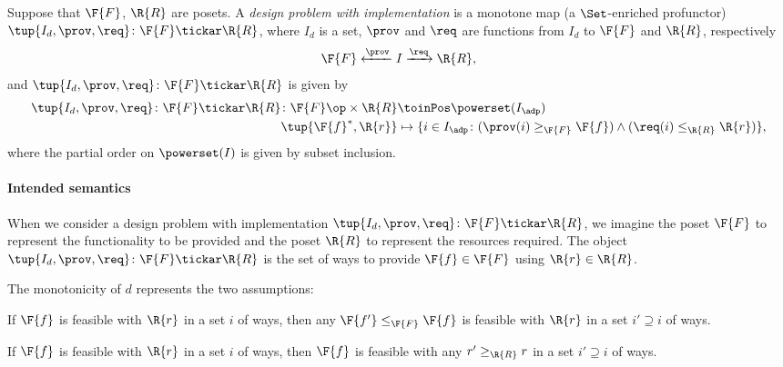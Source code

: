\begin{definition}
\label{def:dpwithimp}
Suppose that $\F{F}$, $\R{R}$ are posets. A \emph{design problem with implementation} is a monotone map (a $\Set$-enriched profunctor) $\tup{I_d,\prov,\req}\colon \F{F}\tickar \R{R}$, where $I_d$ is a set, $\prov$ and $\req$ are functions from $I_d$ to $\F{F}$ and $\R{R}$, respectively
\begin{equation}
    \F{F} \xleftarrow{\prov} I \xrightarrow{\req} \R{R},
\end{equation}
and $\tup{I_d,\prov,\req}\colon \F{F}\tickar \R{R}$ is given by
\begin{equation}
\begin{aligned}
\tup{I_d,\prov,\req}\colon \F{F}\tickar \R{R} \colon \F{F}\op \times \R{R} &\toinPos \powerset(I_\adp) \\
\tup{\F{f}^*, \R{r}} &\mapsto \{ i \in I_\adp \colon (\prov(i) \geq_\F{F} \F{f}) \wedge (\req(i) \leq_\R{R} \R{r}) \},
\end{aligned}
\end{equation}
where the partial order on $\powerset(I)$ is given by subset inclusion.
\end{definition}
\paragraph{Intended semantics} When we consider a design problem with implementation $\tup{I_d,\prov,\req}\colon \F{F}\tickar \R{R}$, we imagine the poset $\F{F}$ to represent the functionality to be provided and the poset $\R{R}$ to represent the resources required. The object $\tup{I_d,\prov,\req}\colon \F{F}\tickar \R{R}$ is the set of ways to provide $\F{f}\in \F{F}$ using $\R{r}\in \R{R}$.

\noindent The monotonicity of $d$ represents the two assumptions:
\begin{compactenum}
\item If $\F{f}$ is feasible with $\R{r}$ in a set $i$ of ways, then any $\F{f'}\leq_\F{F} \F{f}$ is feasible with $\R{r}$ in a set $i'\supseteq i$ of ways.
\item If $\F{f}$ is feasible with $\R{r}$ in a set $i$ of ways, then $\F{f}$ is feasible with any $r'\geq_\R{R} r$ in a set $i'\supseteq i$ of ways.
\end{compactenum}

